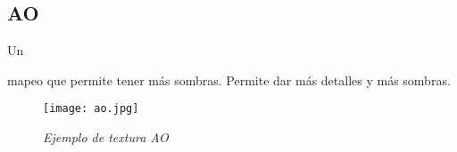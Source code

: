 \documentclass[stu, 12pt, letterpaper, donotrepeattitle, floatsintext, natbib]{apa7}
\begin{document}
    \subsection{AO}
    Un \begin{justifying}
      mapeo que permite tener más sombras. Permite dar más detalles y más sombras.\par
    \end{justifying}
    \begin{figure}[H]
      \caption{\emph{Ejemplo de textura AO}}
      \centering
      \texttt{[image: ao.jpg]}
      \bigskip
    \end{figure}
    
    \newpage   
    \renewcommand\refname{\textbf{Referencias}}
    
    
\end{document}
